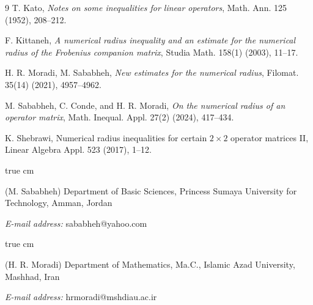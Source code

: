 \documentclass[12pt,twoside,reqno]{amsart}
\numberwithin{equation}{section}
\begin{document}
\begin{thebibliography}{9}
T. Kato, {\it Notes on some inequalities for linear operators}, Math. Ann. {125} (1952), 208--212.


F. Kittaneh, {\it A numerical radius inequality and an estimate for the numerical radius of the Frobenius companion matrix}, Studia Math. {158}(1) (2003), 11--17.


H. R. Moradi, M. Sababheh, {\it New estimates for the numerical radius}, Filomat. 35(14) (2021), 4957--4962.

M. Sababheh, C. Conde, and  H. R. Moradi, {\it On the numerical radius of an operator matrix}, Math. Inequal. Appl. 27(2) (2024),  417--434.

 K. Shebrawi, Numerical radius inequalities for certain $2\times 2 $ operator matrices II, Linear Algebra Appl. 523 (2017), 1--12.
\end{thebibliography}



 true cm 	

{\tiny (M. Sababheh) Department of Basic Sciences, Princess Sumaya University for Technology, Amman, Jordan
	
\textit{E-mail address:} sababheh@yahoo.com}

 true cm 	

{\tiny (H. R. Moradi) Department of Mathematics, Ma.C., Islamic Azad University, Mashhad, Iran 
	
\textit{E-mail address:} hrmoradi@mshdiau.ac.ir}
\end{document}
